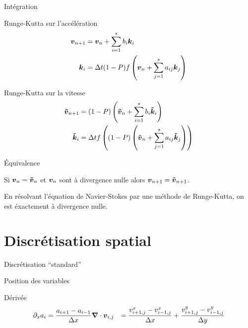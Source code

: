 \begin{frame}[<+->]{Intégration}
 \begin{block}{Runge-Kutta sur l'accélération}
   \begin{align*}
	{\boldsymbol {v}}_{n+1}&={\boldsymbol {v}}_{n}+\sum_{i=1}^{s}b_{i}{\boldsymbol {k}}_{i}\\
	{\boldsymbol {k}}_{i}&=\Delta t (1-P)f\left({\boldsymbol {v}}_{n}+\sum_{j=1}^{s}a_{ij}{\boldsymbol {k}}_{j}\right)
\end{align*}
 \end{block}
 
  \begin{block}{Runge-Kutta sur la vitesse}
   \begin{align*}
{\boldsymbol {\tilde{v}}}_{n+1}&=(1-P)\left({\boldsymbol {\tilde{v}}}_{n}+\sum_{i=1}^{s}b_{i}{\boldsymbol {\tilde{k}}}_{i}\right)\\
{\boldsymbol {\tilde{k}}}_{i}&=\Delta t f\left((1-P)\left({\boldsymbol {\tilde{v}}}_{n}+\sum_{j=1}^{s}a_{ij}{\boldsymbol {\tilde{k}}}_{j}\right)\right)
\end{align*}
 \end{block}
\end{frame}
\begin{frame}{Équivalence}
 \begin{theorem}
Si ${\boldsymbol {v}}_{n}={\boldsymbol {\tilde{v}}}_{n}$ et ${\boldsymbol {v}}_n$ sont à divergence nulle alors ${\boldsymbol {v}}_{n+1}={\boldsymbol {\tilde{v}}}_{n+1}$.
 \end{theorem}
 
\begin{corollary}
En résolvant l'équation de Navier-Stokes par une méthode de Runge-Kutta, on est éxactement à divergence nulle.
\end{corollary}
\end{frame}


\section{Discrétisation spatial}
\begin{frame}{Discrétisation ``standard''}
\begin{block}{Position des variables}
\shorthandoff{;:} 
\shorthandon{:;}
\end{block}
\begin{block}{Dérivée}
 \begin{align*}
  \partial_x a_i&=\frac{a_{i+1}-a_{i-1}}{\Delta x}
  {\boldsymbol {\nabla}} \cdot {\boldsymbol {v}}_{i,j}&=\frac{v^{x}_{i+1,j}-v^{x}_{i-1,j}}{\Delta x}+\frac{v^{y}_{i+1,j}-v^{y}_{i-1,j}}{\Delta y}
\end{align*}
\end{block}
\end{frame}


